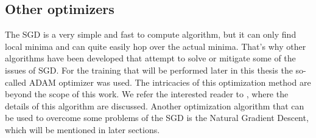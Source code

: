 \subsection{Other optimizers}
The SGD is a very simple and fast to compute algorithm, but it can only find local minima and can quite easily hop over the actual minima. That's why other algorithms have been developed that attempt to solve or mitigate some of the issues of SGD. For the training that will be performed later in this thesis the so-called ADAM optimizer was used. The intricacies of this optimization method are beyond the scope of this work. We refer the interested reader to \cite{adamPaper}, where the details of this algorithm are discussed. Another optimization algorithm that can be used to overcome some problems of the SGD is the Natural Gradient Descent, which will be mentioned in later sections.


